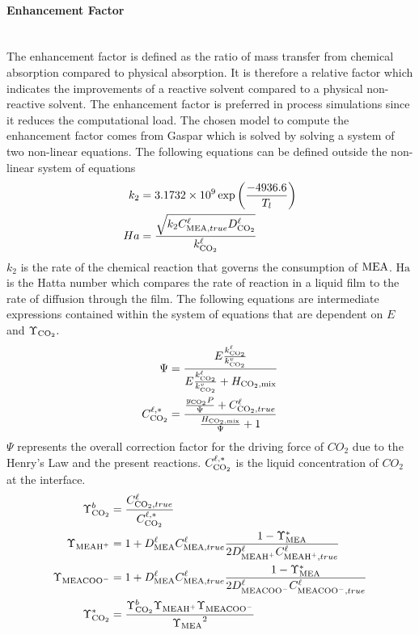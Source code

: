 \documentclass[a4paper,fleqn]{cas-sc}
\newcommand{\COtwo}{{\ce{CO2}}}
\newcommand{\MEA}{{\ce{MEA}}}
\newcommand{\MEAH}{\ce{MEAH+}}
\newcommand{\MEACOO}{{\ce{MEACOO-}}}
\newcommand{\liq}{\ell}
\newcommand{\vap}{v}
\begin{document}
    \paragraph{Enhancement Factor}\mbox{}\\[0.5em]
    The enhancement factor is defined as the ratio of mass transfer from chemical absorption compared to physical absorption. It is therefore a relative factor which indicates the improvements of a reactive solvent compared to a physical non-reactive solvent. The enhancement factor is preferred in process simulations since it reduces the computational load. The chosen model to compute the enhancement factor comes from Gaspar\cite{Gaspar2015} which is solved by solving a system of two non-linear equations. The following equations can be defined outside the non-linear system of equations
    \begin{align}
        k_2 &= 3.1732 \times 10^{9} \exp\left( \frac{-4936.6}{T_l}\right) \\
        Ha &= \frac{\sqrt{k_2 C^{\liq}_{\MEA,true} D^{\liq}_{\COtwo}}}{k^{\liq}_{\COtwo}}
    \end{align}
    $k_2$ is the rate of the chemical reaction that governs the consumption of $\MEA$. $\text{Ha}$ is the Hatta number which compares the rate of reaction in a liquid film to the rate of diffusion through the film. The following equations are intermediate expressions contained within the system of equations that are dependent on $E$ and $\Upsilon_{\COtwo}.$
    \begin{align}
        \Psi &= \frac{E \frac{k^{\liq}_{ \COtwo}}{k^{\vap}_{ \COtwo}}}{E \frac{k^{\liq}_{ \COtwo}}{k^{\vap}_{ \COtwo}} + H_{\COtwo, \text{mix}}} \\
        C^{\liq,*}_{ \COtwo} &= \frac{\frac{y_{\COtwo}P}{\Psi} + C^{\liq}_{ \COtwo, true}}{\frac{H_{\COtwo,\text{mix}}}{\Psi} + 1}
    \end{align}
    $\Psi$ represents the overall correction factor for the driving force of $CO_2$ due to the Henry's Law and the present reactions. $C^{\liq, *}_{ \COtwo}$ is the liquid concentration of $CO_2$ at the interface.
    \begin{align}
        \Upsilon_{\COtwo}^b &= \frac{C^{\liq}_{ \COtwo, true}}{C^{\liq,*}_{ \COtwo}} \\
        \Upsilon_{\MEAH} &= 1+D^{\liq}_{ \MEA} {C^{\liq}_{\MEA, true}}\frac{1 - \Upsilon^{*}_{\MEA}}{2 D^{\liq}_{ \MEAH} C^{\liq}_{ \MEAH, true}} \\
        \Upsilon_{\MEACOO} &= 1+D^{\liq}_{ \MEA} {C^{\liq}_{\MEA, true}}\frac{1 - \Upsilon^{*}_{\MEA}}{2 D^{\liq}_{ \MEACOO} C^{\liq}_{ \MEACOO, true}} \\
        \Upsilon_{\COtwo}^{*} &= \frac{\Upsilon^{b}_{\COtwo} \Upsilon_{\MEAH} \Upsilon_{\MEACOO}}{{\Upsilon_{\MEA}}^{2}}
    \end{align}
\end{document}
